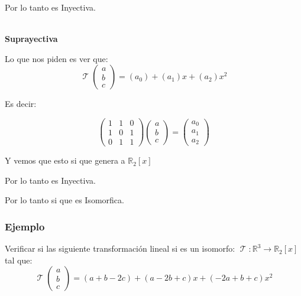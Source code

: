 \documentclass[12pt]{report}                                    %
\DeclareMathOperator \LinealTransformation {\mathcal{T}}        %
\begin{document}
            Por lo tanto es Inyectiva.

            \textbf{\\Suprayectiva}

            Lo que nos piden es ver que:
            \begin{equation*}
                \LinealTransformation(\begin{matrix}a\\b\\c\end{matrix}) = (a_0) +(a_1)x+(a_2)x^2
            \end{equation*}

            Es decir:

            \begin{equation*}
                \begin{pmatrix}1&1&0\\1&0&1\\0&1&1\end{pmatrix}
                \begin{pmatrix}a\\b\\c\end{pmatrix}
                =
                \begin{pmatrix}a_0\\a_1\\a_2\end{pmatrix}
            \end{equation*}

            Y vemos que esto si que genera a $\mathbb{R}_2[x]$

            Por lo tanto es Inyectiva.  

            Por lo tanto si que es Isomorfica.   


            \clearpage
            \subsubsection{Ejemplo}
            Verificar si las siguiente transformación lineal si es un isomorfo:
            $\LinealTransformation : \mathbb{R}^3 \to \mathbb{R}_2[x]$ tal que: 
            \begin{equation*}
                \LinealTransformation(\begin{matrix}a\\b\\c\end{matrix}) = (a+b-2c)+(a-2b+c)x+(-2a+b+c)x^2
            \end{equation*}
\end{document}
